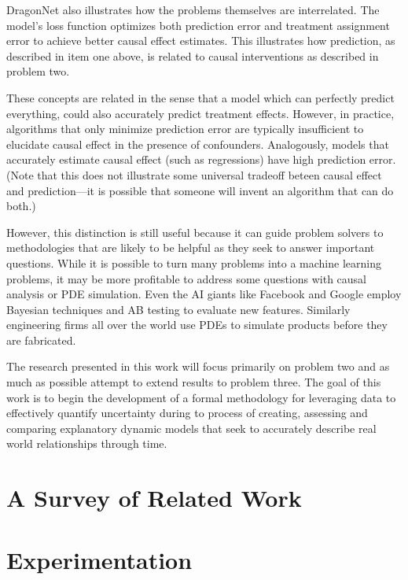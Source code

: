 \documentclass{article}
\begin{document}
DragonNet also illustrates how the problems themselves are interrelated. The model's loss function optimizes both
prediction error and treatment assignment error to achieve better causal effect estimates. This illustrates
how prediction, as described in item one above, is related to causal interventions as described in problem two. 

These concepts are related in the sense that a model which can perfectly predict everything, could also accurately
predict treatment effects. However, in practice, algorithms that only minimize prediction error are typically insufficient to 
elucidate causal effect in the presence of confounders. Analogously, models that accurately estimate causal effect 
(such as regressions) have high prediction error. (Note that this does not illustrate some universal
tradeoff beteen causal effect and prediction—it is possible that someone will invent an algorithm that can do both.)

However, this distinction is still useful because it can guide problem solvers to methodologies that are likely to
be helpful as they seek to answer important questions. While it is possible to turn many problems into a machine
learning problems, it may be more profitable to address some questions with causal analysis or PDE simulation.
Even the AI giants like Facebook and Google employ Bayesian techniques and AB testing to evaluate new features.
Similarly engineering firms all over the world use PDEs to simulate products before they are fabricated.

The research presented in this work will focus primarily on problem two and as much as possible attempt to extend results
to problem three. The goal of this work is to begin the development of a formal methodology for leveraging data to effectively
quantify uncertainty during to process of creating, assessing and comparing explanatory dynamic models that seek to accurately
describe real world relationships through time. 




\section{A Survey of Related Work}



\section{Experimentation}
\end{document}
